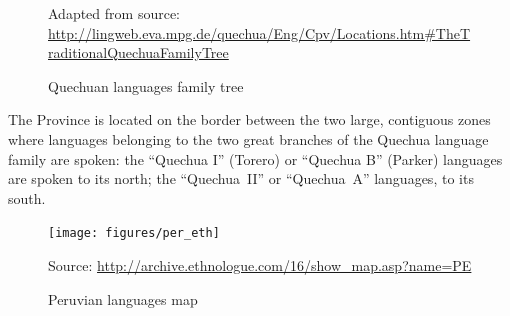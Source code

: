 \begin{figure}[!ht]
{}
\caption{Quechuan languages family tree}\label{Fig1}
\raggedright
{\scriptsize Adapted from source: \url{http://lingweb.eva.mpg.de/quechua/Eng/Cpv/Locations.htm#TheTraditionalQuechuaFamilyTree}}
\end{figure}

The Province is located on the border between the two large, contiguous zones where languages belonging to the two great branches of the Quechua language family are spoken: the “Quechua I” (Torero) or “Quechua B” (Parker) languages are spoken to its north; the “Quechua~II” or “Quechua~A” languages, to its south. 

\begin{figure}[!ht]
\begin{center}
\texttt{[image: figures/per\_eth]}
\end{center}
\caption{Peruvian languages map}\label{Figcomp}
\raggedright
{\scriptsize Source: \url{http://archive.ethnologue.com/16/show_map.asp?name=PE}}
\end{figure}

